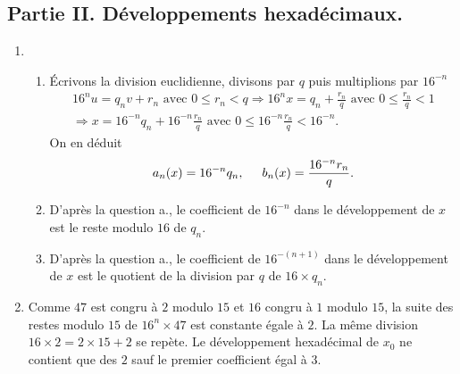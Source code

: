 \subsection*{Partie II. Développements hexadécimaux.}
\begin{enumerate}
 \item 
\begin{enumerate}
 \item \'Ecrivons la division euclidienne, divisons par $q$ puis multiplions par $16^{-n}$
\begin{multline*}
 16^n u = q_n v + r_n \text{ avec } 0\leq r_n < q 
\Rightarrow 
16^n x = q_n  + \frac{r_n}{q} \text{ avec } 0\leq \frac{r_n}{q} < 1 \\
\Rightarrow
x = 16^{-n}q_n + 16^{-n}\frac{r_n}{q} \text{ avec } 0\leq 16^{-n}\frac{r_n}{q} < 16^{-n}.
\end{multline*}
On en déduit 
\begin{displaymath}
 a_n(x) = 16^{-n}q_n, \hspace{0.5cm} b_n(x) = \frac{16^{-n}r_n}{q}.
\end{displaymath}

 \item D'après la question a., le coefficient de $16^{-n}$ dans le développement de $x$ est le reste modulo $16$ de $q_n$.
 \item D'après la question a., le coefficient de $16^{-(n+1)}$ dans le développement de $x$ est le quotient de la division par $q$ de $16\times q_n$.
\end{enumerate}

 \item Comme $47$ est congru à $2$ modulo $15$ et $16$ congru à $1$ modulo $15$, la suite des restes modulo $15$ de $16^n \times 47$ est constante égale à $2$. La même division $16\times 2 = 2\times 15 +2$ se repète. Le développement hexadécimal de $x_0$ ne contient que des $2$ sauf le premier coefficient égal à $3$.


\end{enumerate}
